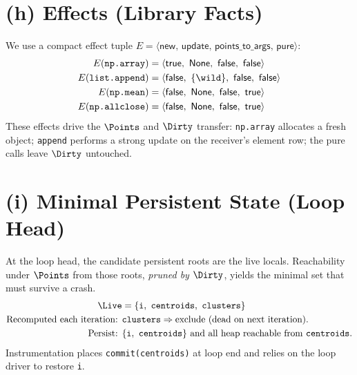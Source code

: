 \section*{(h) Effects (Library Facts)}
We use a compact effect tuple $E = \langle \mathsf{new},\,\mathsf{update},\,\mathsf{points\_to\_args},\,\mathsf{pure}\rangle$:
\begin{align*}
E(\texttt{np.array})      &= \langle \mathsf{true},\ \mathsf{None},\ \mathsf{false},\ \mathsf{false}\rangle\\
E(\texttt{list.append})   &= \langle \mathsf{false},\ \{\wild\},\ \mathsf{false},\ \mathsf{false}\rangle\\
E(\texttt{np.mean})       &= \langle \mathsf{false},\ \mathsf{None},\ \mathsf{false},\ \mathsf{true}\rangle\\
E(\texttt{np.allclose})   &= \langle \mathsf{false},\ \mathsf{None},\ \mathsf{false},\ \mathsf{true}\rangle
\end{align*}
These effects drive the $\Points$ and $\Dirty$ transfer: \texttt{np.array} allocates a fresh object;
\texttt{append} performs a strong update on the receiver's element row; the pure calls leave $\Dirty$ untouched.

\section*{(i) Minimal Persistent State (Loop Head)}
At the loop head, the candidate persistent roots are the live locals.
Reachability under $\Points$ from those roots, \emph{pruned by $\Dirty$}, yields the minimal set that must survive a crash.
\begin{align*}
\Live &= \{\texttt{i},\ \texttt{centroids},\ \texttt{clusters}\}\\
\text{Recomputed each iteration: } &\texttt{clusters} \Rightarrow \text{exclude (dead on next iteration).}\\
\text{Persist: } &\{\texttt{i},\ \texttt{centroids}\}\ \text{and all heap reachable from }\texttt{centroids}.
\end{align*}
Instrumentation places \verb|commit(centroids)| at loop end and relies on the loop driver to restore \texttt{i}.
